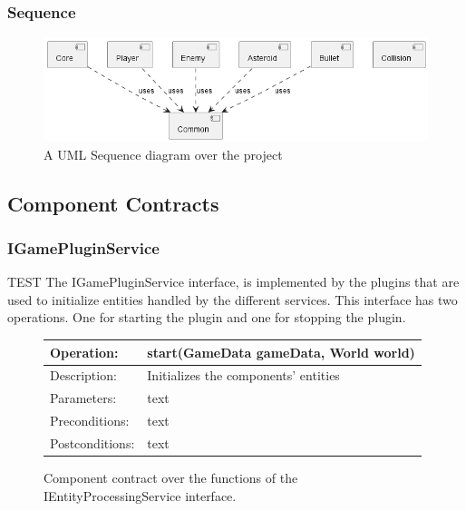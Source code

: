 \subsubsection{Sequence}
\begin{figure}[H]
    \includegraphics[width=\textwidth]{images/diagrams/component.png}
    \caption{A UML Sequence diagram over the project}
\end{figure}

\subsection{Component Contracts}
\subsubsection{IGamePluginService}
TEST
The IGamePluginService interface, is implemented by the plugins that are used to initialize entities handled by the different services.
This interface has two operations. One for starting the plugin and one for stopping the plugin.
\begin{figure}[H]
    \begin{center}
        \begin{tabulary}{1.0\textwidth}{lL}
            \toprule
            Operation:      & start(GameData gameData, World world) \\
            \midrule
            Description:     & Initializes the components' entities  \\
            \midrule
            Parameters:      & text                                  \\
            \midrule
            Preconditions:   & text                                  \\
            \midrule
            Postconditions:  & text                                  \\
            \bottomrule
        \end{tabulary}
    \end{center}
    \caption{Component contract over the functions of the IEntityProcessingService interface.}
\end{figure}

